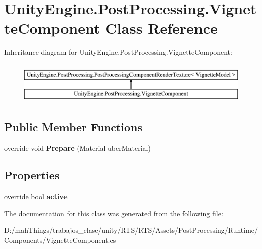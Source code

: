 \hypertarget{class_unity_engine_1_1_post_processing_1_1_vignette_component}{}\section{Unity\+Engine.\+Post\+Processing.\+Vignette\+Component Class Reference}
\label{class_unity_engine_1_1_post_processing_1_1_vignette_component}
Inheritance diagram for Unity\+Engine.\+Post\+Processing.\+Vignette\+Component\+:\begin{figure}[H]
\begin{center}
\leavevmode
\includegraphics[height=2.000000cm]{class_unity_engine_1_1_post_processing_1_1_vignette_component}
\end{center}
\end{figure}
\subsection*{Public Member Functions}
\begin{DoxyCompactItemize}
\item 
\mbox{\label{class_unity_engine_1_1_post_processing_1_1_vignette_component_a7f8b6fca0970717decfc4148d42c43be}} 
override void {\bfseries Prepare} (Material uber\+Material)
\end{DoxyCompactItemize}
\subsection*{Properties}
\begin{DoxyCompactItemize}
\item 
\mbox{\label{class_unity_engine_1_1_post_processing_1_1_vignette_component_a74f4203a32fb845ba8aec4d7b204c80f}} 
override bool {\bfseries active}
\end{DoxyCompactItemize}


The documentation for this class was generated from the following file\+:\begin{DoxyCompactItemize}
\item 
D\+:/mah\+Things/trabajos\+\_\+clase/unity/\+R\+T\+S/\+R\+T\+S/\+Assets/\+Post\+Processing/\+Runtime/\+Components/Vignette\+Component.\+cs\end{DoxyCompactItemize}
